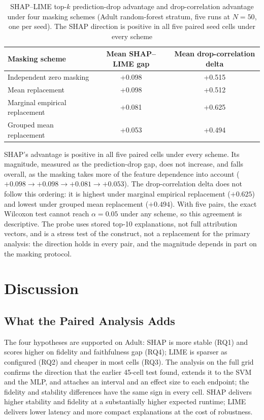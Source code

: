 \documentclass{cleiej}
\begin{document}
\begin{table}[htb]
\centering
\caption{SHAP--LIME top-$k$ prediction-drop advantage and drop-correlation
advantage under four masking schemes (Adult random-forest stratum, five
runs at $N=50$, one per seed). The SHAP direction is positive in all five
paired seed cells under every scheme}
\label{tab:masking}
\begin{tabular}{lcc}
\toprule
Masking scheme & Mean SHAP--LIME gap & Mean drop-correlation delta \\
\midrule
Independent zero masking      & +0.098 & +0.515 \\
Mean replacement               & +0.098 & +0.512 \\
Marginal empirical replacement & +0.081 & +0.625 \\
Grouped mean replacement       & +0.053 & +0.494 \\
\bottomrule
\end{tabular}
\end{table}

SHAP's advantage is positive in all five paired cells under every scheme.
Its magnitude, measured as the prediction-drop gap, does not increase, and
falls overall, as the masking takes more of the feature dependence into
account ($+0.098 \rightarrow +0.098 \rightarrow +0.081 \rightarrow
+0.053$). The drop-correlation delta does not follow this ordering: it is
highest under marginal empirical replacement ($+0.625$) and lowest under
grouped mean replacement ($+0.494$). With five pairs, the exact Wilcoxon
test cannot reach $\alpha = 0.05$ under any scheme, so this agreement is
descriptive. The probe uses stored top-10 explanations, not full
attribution vectors, and is a stress test of the construct, not a
replacement for the primary analysis: the direction holds in every pair,
and the magnitude depends in part on the masking protocol.

\section{Discussion}
\label{sec:discussion}

\subsection{What the Paired Analysis Adds}

The four hypotheses are supported on Adult: SHAP is more stable (RQ1) and
scores higher on fidelity and faithfulness gap (RQ4); LIME is sparser as
configured (RQ2) and cheaper in most cells (RQ3). The analysis on the full
grid confirms the direction that the earlier 45-cell test found, extends it
to the SVM and the MLP, and attaches an interval and an effect size to each
endpoint; the fidelity and stability differences have the same sign in
every cell.
SHAP delivers higher stability and fidelity at a substantially higher
expected runtime; LIME delivers lower latency and more compact explanations
at the cost of robustness.
\end{document}
